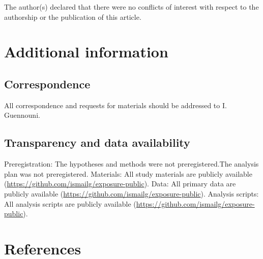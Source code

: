 \documentclass[
]{article}
\begin{document}
The author(s) declared that there were no conflicts of interest with respect to the authorship or the publication of this article.

\section*{Additional information}\label{additional-information}

\subsection*{Correspondence}\label{correspondence}

All correspondence and requests for materials should be addressed to I. Guennouni.

\subsection*{Transparency and data availability}\label{transparency-and-data-availability}

Preregistration: The hypotheses and methods were not preregistered.The analysis plan was not preregistered. Materials: All study materials are publicly available (\url{https://github.com/ismailg/exposure-public}). Data: All primary data are publicly available (\url{https://github.com/ismailg/exposure-public}). Analysis scripts: All analysis scripts are publicly available (\url{https://github.com/ismailg/exposure-public}).

\section*{References}\label{references}
\end{document}
